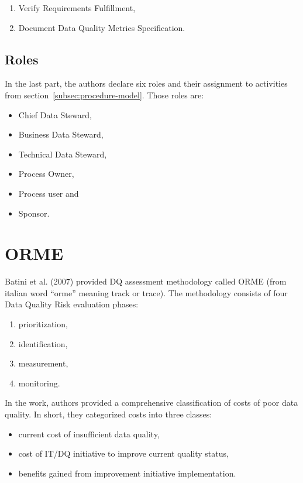 \begin{enumerate}
    \item Verify Requirements Fulfillment,
    \item Document Data Quality Metrics Specification.
\end{enumerate}

\subsection{Roles}

In the last part, the authors declare six roles and their assignment to activities from section~\ref{subsec:procedure-model}.
Those roles are:

\begin{itemize}
    \item Chief Data Steward,
    \item Business Data Steward,
    \item Technical Data Steward,
    \item Process Owner,
    \item Process user and
    \item Sponsor.
\end{itemize}

\section{ORME}

Batini et al. (2007) provided DQ assessment methodology called ORME (from italian word \enquote{orme} meaning track or trace).
The methodology consists of four Data Quality Risk evaluation phases:

\begin{enumerate}
    \item prioritization,
    \item identification,
    \item measurement,
    \item monitoring.
\end{enumerate}

In the work, authors provided a comprehensive classification of costs of poor data quality.
In short, they categorized costs into three classes:

\begin{itemize}
    \item current cost of insufficient data quality,
    \item cost of IT/DQ initiative to improve current quality status,
    \item benefits gained from improvement initiative implementation.
\end{itemize}

